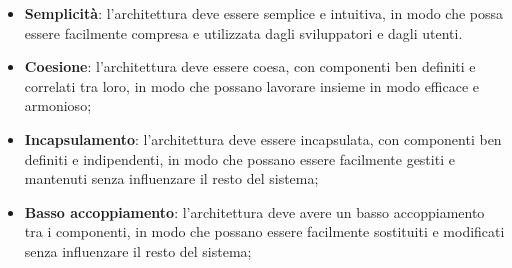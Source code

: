 \begin{itemize}
	\item \textbf{Semplicità}: l'architettura deve essere semplice e intuitiva, in modo che possa essere facilmente compresa e utilizzata dagli sviluppatori e dagli utenti.
	\item \textbf{Coesione}: l'architettura deve essere coesa, con componenti ben definiti e correlati tra loro, in modo che possano lavorare insieme in modo efficace e armonioso;
	\item \textbf{Incapsulamento}: l'architettura deve essere incapsulata, con componenti ben definiti e indipendenti, in modo che possano essere facilmente gestiti e mantenuti senza influenzare il resto del sistema;
	\item \textbf{Basso accoppiamento}: l'architettura deve avere un basso accoppiamento tra i componenti, in modo che possano essere facilmente sostituiti e modificati senza influenzare il resto del sistema;
\end{itemize}

